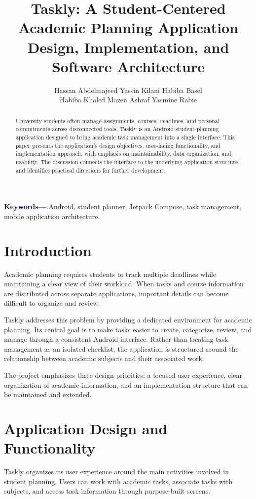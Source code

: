 \documentclass[10pt,a4paper,twocolumn]{article}
\title{
  \vspace{-1.15cm}
  {\Large\bfseries\color{navy}
  Taskly: A Student-Centered Academic Planning Application}\\[5pt]
  {\normalsize\color{teal}
  Design, Implementation, and Software Architecture}
  \vspace{-5pt}
}
\author{
  \normalsize
  Hassan Abdelmajeed \quad
  Yassin Kilani \quad
  Habiba Basel\\[3pt]
  Habiba Khaled \quad
  Mazen Ashraf \quad
  Yasmine Rabie
}
\date{}
\begin{document}
\maketitle
\vspace{-12pt}

\begin{abstract}
University students often manage assignments, courses, deadlines, and
personal commitments across disconnected tools. Taskly is an Android
student-planning application designed to bring academic task management
into a single interface. This paper presents the application's design
objectives, user-facing functionality, and implementation approach,
with emphasis on maintainability, data organization, and usability.
The discussion connects the interface to the underlying application
structure and identifies practical directions for further development.
\end{abstract}

\noindent\textbf{\textcolor{navy}{Keywords---}}
Android, student planner, Jetpack Compose, task management,
mobile application architecture.

\section{Introduction}

Academic planning requires students to track multiple deadlines while
maintaining a clear view of their workload. When tasks and course
information are distributed across separate applications, important
details can become difficult to organize and review.

Taskly addresses this problem by providing a dedicated environment for
academic planning. Its central goal is to make tasks easier to create,
categorize, review, and manage through a consistent Android interface.
Rather than treating task management as an isolated checklist, the
application is structured around the relationship between academic
subjects and their associated work.

The project emphasizes three design priorities: a focused user
experience, clear organization of academic information, and an
implementation structure that can be maintained and extended.

\section{Application Design and Functionality}

Taskly organizes its user experience around the main activities involved
in student planning. Users can work with academic tasks, associate tasks
with subjects, and access task information through purpose-built screens.
\end{document}
